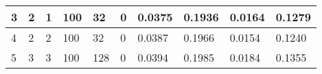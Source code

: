 \begin{table}
{\begin{tabular}{|llllllllll|}
3             & 2                                                               & 1                                                               & 100            & 32                                                             & 0                & 0.0375                                                                    & 0.1936                                                                   & 0.0164                                                               & 0.1279                                                              \\ \hline
4             & 2                                                               & 2                                                               & 100            & 32                                                             & 0                & 0.0387                                                                    & 0.1966                                                                   & 0.0154                                                               & 0.1240                                                              \\ \hline
5             & 3                                                               & 3                                                               & 100            & 128                                                            & 0                & 0.0394                                                                    & 0.1985                                                                   & 0.0184                                                               & 0.1355                                                              \\ \hline
\end{tabular}}
\end{table}

